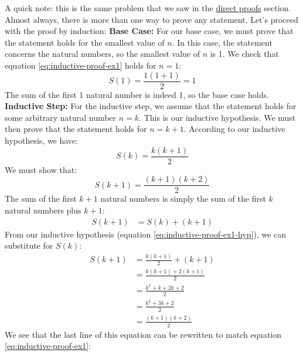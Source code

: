 \begin{answer}
    A quick note: this is the same problem that we saw in the \hyperref[sec:proofs]{direct proofs} section. Almost always, there is more than 
    one way to prove any statement. Let's proceed with the proof by induction:
    \newline\newline
    \textbf{Base Case:} For our base case, we must prove that the statement holds for the smallest 
    value of $n$. In this case, the statement concerns the natural numbers, so the smallest value of $n$ is 1. 
    We check that equation \ref{eq:inductive-proof-ex1} holds for $n=1$:
    \begin{equation*}
        S(1) = \frac{1(1+1)}{2} = 1
    \end{equation*}
    The sum of the first 1 natural number is indeed 1, so the base case holds.
    \newline\newline
    \textbf{Inductive Step:} For the inductive step, we assume that the statement holds for some arbitrary natural number $n=k$. 
    This is our inductive hypothesis. We must then prove that the statement holds for $n=k+1$. 
    According to our inductive hypothesis, we have:
    \begin{equation}\label{eq:inductive-proof-ex1-hyp}
        S(k) = \frac{k(k+1)}{2}
    \end{equation}
    We must show that:
    \begin{equation*}
        S(k+1) = \frac{(k+1)(k+2)}{2}
    \end{equation*}
    The sum of the first $k+1$ natural numbers is simply the sum of the first $k$ natural numbers plus $k+1$:
    \begin{align*}
        S(k+1) &= S(k) + (k+1) 
    \end{align*}
    From our inductive hypothesis (equation \ref{eq:inductive-proof-ex1-hyp}), we can substitute for $S(k)$:
    \begin{align*}
                S(k+1) &= \frac{k(k+1)}{2} + (k+1) \\
                &= \frac{k(k+1) + 2(k+1)}{2}  \\
                &= \frac{k^2 + k + 2k + 2}{2} \\
                &= \frac{k^2 + 3k + 2}{2} \\
                &= \frac{(k+1)(k + 2)}{2}
    \end{align*}
    We see that the last line of this equation can be rewritten to match equation \ref{eq:inductive-proof-ex1}:

\end{answer}
